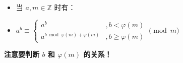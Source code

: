 \documentclass[E:/GsjzTle/main/main.tex]{subfiles}
\begin{document}
\begin{itemize}
\item
  当 \(a,m\in \mathbb{Z}\) 时有：
\item
  \(a^b\equiv\left\{\begin{matrix}a^b&,b<\varphi(m)\\a^{b\bmod\varphi(m)+\varphi(m)}&,b\ge\varphi(m)\end{matrix}\right.\pmod m\)
\end{itemize}

\textbf{注意要判断 \(b\) 和 \(\varphi(m)\) 的关系！}
\end{document}
